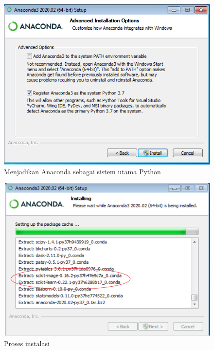 \begin{figure}[h!]
  \begin{center}
    \includegraphics[scale=.5]{pics/anacondaInstall5.png}
    \caption{Menjadikan Anaconda sebagai sistem utama Python}
    \label{fig:utama}
  \end{center}
\end{figure}

\begin{figure}[h!]
  \begin{center}
    \includegraphics[scale=.5]{pics/anacondaInstall6a.png}
    \caption{Proses instalasi}
    \label{fig:prosesInstalasi}
  \end{center}
\end{figure}

